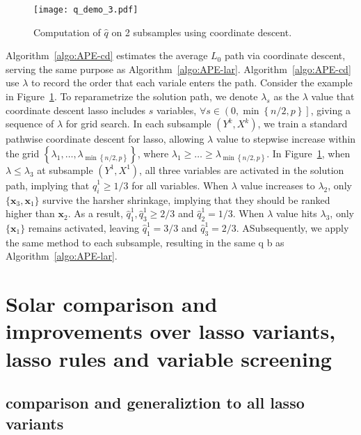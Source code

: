 \documentclass[12pt]{article}
\begin{document}
\begin{figure}[h]
  \centering
  \texttt{[image: q\_demo\_3.pdf]}
  \caption{Computation of $\widehat{q}$ on 2 subsamples using coordinate descent.}
  \label{fig:q_demo_3}
\end{figure}

Algorithm~\ref{algo:APE-cd} estimates the average $L_0$ path via coordinate descent, serving the same purpose
as Algorithm~\ref{algo:APE-lar}. Algorithm~\ref{algo:APE-cd} use $\lambda$ to record the order that each variale enters the path. Consider the example in Figure~\ref{fig:q_demo_3}. To reparametrize the solution path, we denote $\lambda_s$ as the $\lambda$ value that coordinate descent lasso includes $s$ variables, $\forall s\in \left( 0, \min \left\{ n/2, p \right\} \right]$, giving a sequence of $\lambda$ for grid search. In each subsample $\left( Y^k, X^k \right)$, we train a standard pathwise coordinate descent for lasso, allowing $\lambda$ value to stepwise increase within the grid $\left\{\lambda_1, \ldots, \lambda_{ \min \left\{ n/2, p \right\} } \right\}$, where $\lambda_1 \geqslant \ldots \geqslant \lambda_{ \min \left\{ n/2, p \right\} }$. In Figure~\ref{fig:q_demo_3}, when $\lambda \leqslant \lambda_3$ at subsample $\left( Y^1, X^1 \right)$, all three variables are activated in the solution path, implying that $\widehat{q}^1_i \geqslant 1/3$ for all variables. When $\lambda$ value increases to $\lambda_2$, only $\{\mathbf{x}_3, \mathbf{x}_1\}$ survive the harsher shrinkage, implying that they should be ranked higher than $\mathbf{x}_2$. As a result, $\widehat{q}^1_1, \widehat{q}^1_3 \geqslant 2/3$ and $\widehat{q}^1_2 = 1/3$. When $\lambda$ value hits $\lambda_3$, only $\{\mathbf{x}_1\}$ remains activated, leaving $\widehat{q}^1_1 = 3/3$ and $\widehat{q}^1_3 = 2/3$. ASubsequently, we apply the same method to each subsample, resulting in the same q b as Algorithm~\ref{algo:APE-lar}. 

\section{Solar comparison and improvements over lasso variants, lasso rules and variable screening \label{section:adv}}

\subsection{comparison and generaliztion to all lasso variants}
\end{document}
